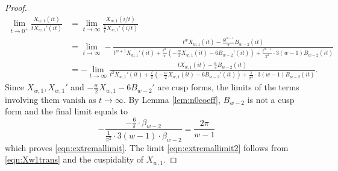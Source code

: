 \documentclass[10pt,a4paper]{amsart}
\begin{document}
\begin{proof}
\begin{align*}
        \lim_{t \to 0^+} \frac{X_{w, 1}(it)}{t X_{w, 1}'(it)} &= \lim_{t \to \infty} \frac{X_{w, 1}(i/t)}{\frac{1}{t} X_{w, 1}'(i/t)} \\
        &= \lim_{t \to \infty} -\frac{t^w X_{w, 1}(it) - \frac{6 t^{w-1}}{\pi} B_{w-2}(it)}{t^{w+1} X_{w, 1}'(it) + \frac{t^w}{\pi} \left(-\frac{w}{2} X_{w, 1}(it) - 6 B_{w-2}'(it)\right) + \frac{t^{w-1}}{\pi^2} \cdot 3(w-1) B_{w-2}(it)} \\
        &= -\lim_{t \to \infty} \frac{t X_{w, 1}(it) - \frac{6}{\pi} B_{w-2}(it)}{t^2 X_{w, 1}'(it) + \frac{t}{\pi} \left(-\frac{w}{2} X_{w, 1}(it) - 6 B_{w-2}'(it)\right) + \frac{1}{\pi^2} \cdot 3(w-1) B_{w-2}(it)}.
    \end{align*}
    Since $X_{w, 1}, X_{w, 1}'$ and $-\frac{w}{2} X_{w, 1} - 6 B_{w-2}'$ are cusp forms, the limits of the terms involving them vanish as $t \to \infty$.
    By Lemma \ref{lem:n0coeff}, $B_{w-2}$ is not a cusp form and the final limit equals to
    \[
    -\frac{-\frac{6}{\pi} \cdot \beta_{w-2}}{\frac{1}{\pi^2} \cdot 3(w-1) \cdot \beta_{w-2}} = \frac{2\pi}{w-1}
    \]
    which proves \eqref{eqn:extremallimit}.
    The limit \eqref{eqn:extremallimit2} follows from \eqref{eqn:Xw1trans} and the cuspidality of $X_{w, 1}$.
\end{proof}
\end{document}
